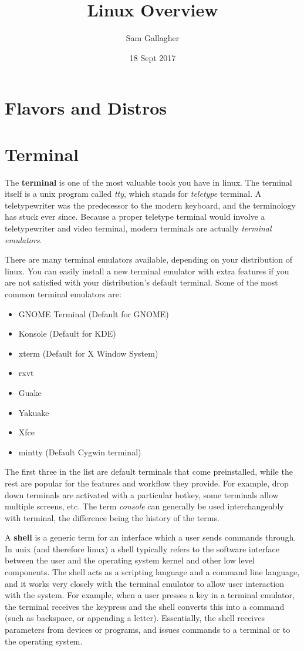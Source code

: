 \documentclass{article}
\title{Linux Overview}
\date{18 Sept 2017}
\author{Sam Gallagher}
\begin{document}
	\maketitle
	\newpage
	\section{Flavors and Distros}
	
	\section{Terminal}
	The \textbf{terminal} is one of the most valuable tools you have in linux. The terminal itself is a unix program called \textit{tty}, which stands for \textit{teletype} terminal. A teletypewriter was the predecessor to the modern keyboard, and the terminology has stuck ever since. Because a proper teletype terminal would involve a teletypewriter and video terminal, modern terminals are actually \textit{terminal emulators}. 
	
	There are many terminal emulators available, depending on your distribution of linux. You can easily install a new terminal emulator with extra features if you are not satisfied with your distribution's default terminal. Some of the most common terminal emulators are:
	\begin{itemize}
	\item GNOME Terminal (Default for GNOME)
	\item Konsole (Default for KDE)
	\item xterm (Default for X Window System)
	\item rxvt
	\item Guake
	\item Yakuake
	\item Xfce
	\item mintty (Default Cygwin terminal)
	\end{itemize}
	
	The first three in the list are default terminals that come preinstalled, while the rest are popular for the features and workflow they provide. For example, drop down terminals are activated with a particular hotkey, some terminals allow multiple screens, etc. The term \textit{console} can generally be used interchangeably with terminal, the difference being the history of the terms. 
	
	A \textbf{shell} is a generic term for an interface which a user sends commands through. In unix (and therefore linux) a shell typically refers to the software interface between the user and the operating system kernel and other low level components. The shell acts as a scripting language and a command line language, and it works very closely with the terminal emulator to allow user interaction with the system. For example, when a user presses a key in a terminal emulator, the terminal receives the keypress and the shell converts this into a command (such as backspace, or appending a letter). Essentially, the shell receives parameters from devices or programs, and issues commands to a terminal or to the operating system. 
	
\end{document}
